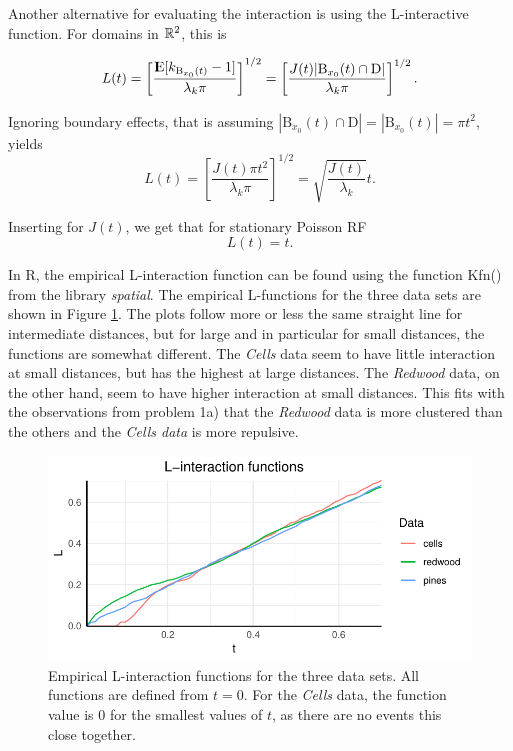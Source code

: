 Another alternative for evaluating the interaction is using the L-interactive function. For domains in $\mathbb{R}^2$, this is

\begin{equation}
    L(t) = \left[\frac{{\rm I\kern-.3em E}{[k_{\textrm{B}_{x_0}(t)}-1]}}{\lambda_k \pi}\right]^{1/2} = \left[\frac{J(t)|\textrm{B}_{x_0}(t) \cap \textrm{D}|}{\lambda_k \pi}\right]^{1/2}.
\end{equation}

Ignoring boundary effects, that is assuming $|\textrm{B}_{x_0}(t) \cap \textrm{D}| = |\textrm{B}_{x_0}(t)| = \pi t^2$, yields
\begin{equation}
    L(t) = \left[\frac{J(t)\pi t^2}{\lambda_k \pi}\right]^{1/2} = \sqrt{\frac{J(t)}{\lambda_k}}t .
    \label{eq:L_function}
\end{equation}

Inserting for $J(t)$, we get that for stationary Poisson RF
\begin{equation}
    L(t) = t.
\end{equation}

In R, the empirical L-interaction function can be found using the function Kfn() from the library \textit{spatial}. The empirical L-functions for the three data sets are shown in Figure \ref{fig:L_emp}. The plots follow more or less the same straight line for intermediate distances, but for large and in particular for small distances, the functions are somewhat different. The \textit{Cells} data seem to have little interaction at small distances, but has the highest at large distances. The \textit{Redwood} data, on the other hand, seem to have higher interaction at small distances. This fits with the observations from problem 1a) that the \textit{Redwood} data is more clustered than the others and the \textit{Cells data} is more repulsive. 

\begin{figure}
    \centering
    \includegraphics[scale=0.95]{figures/prob1_L_empirical.pdf}
    \caption{Empirical L-interaction functions for the three data sets. All functions are defined from $t = 0$. For the \textit{Cells} data, the function value is $0$ for the smallest values of $t$, as there are no events this close together.}
    \label{fig:L_emp}
\end{figure}

